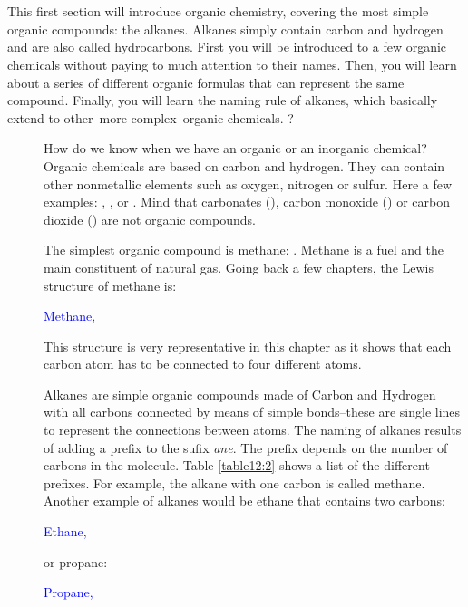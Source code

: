 \documentclass[main.tex]{subfiles}
\begin{document}
\section{\color{blue!30!black}{Alkanes}}
This first section will introduce organic chemistry, covering the most simple organic compounds: the alkanes. Alkanes simply contain carbon and hydrogen and are also called hydrocarbons. First you will be introduced to a few organic chemicals without paying to much attention to their names. Then, you will learn about a series of different organic formulas that can represent the same compound. Finally, you will learn the naming rule of alkanes, which basically extend to other--more complex--organic chemicals.
\sloppy
?\begin{description}
\item[] How do we know when we have an organic or an inorganic chemical? Organic chemicals are based on carbon and hydrogen. They can contain other nonmetallic elements such as oxygen, nitrogen or sulfur. Here a few examples: , ,  or . Mind that carbonates (), carbon monoxide () or carbon dioxide () are not organic compounds. 

\item[] The simplest organic compound is methane: . Methane is a fuel and the main constituent of natural gas. Going back a few chapters, the Lewis structure of methane is:
\begin{center}\hspace{0.5cm}\textcolor{blue}{Methane, }\end{center}
This structure is very representative in this chapter as it shows that each carbon atom has to be connected to four different atoms.

\item[] Alkanes are simple organic compounds made of Carbon and Hydrogen with all carbons connected by means of simple bonds--these are single lines to represent the connections between atoms. The naming of alkanes results of adding a prefix to the sufix \emph{ane}. The prefix depends on the number of carbons in the molecule. Table \ref{table12:2} shows a list of the different prefixes. For example, the alkane with one carbon is called methane. Another example of alkanes would be ethane that contains two carbons:
\begin{center} \hspace{0.5cm}\textcolor{blue}{Ethane, }\end{center}
or propane:
\begin{center} \hspace{0.5cm}\textcolor{blue}{Propane, }\end{center}





\end{description}
\end{document}
